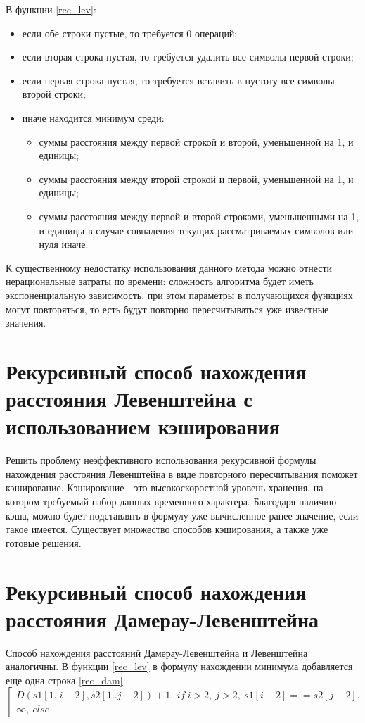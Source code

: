 В функции \ref{rec_lev}:
\begin{itemize}
	\item если обе строки пустые, то требуется 0 операций;
	\item если вторая строка пустая, то требуется удалить все символы первой строки;
	\item если первая строка пустая, то требуется вставить в пустоту все символы второй строки;
	\item иначе находится минимум среди:
	\begin{itemize}
		\item суммы расстояния между первой строкой и второй, уменьшенной на 1, и единицы;
		\item суммы расстояния между второй строкой и первой, уменьшенной на 1, и единицы;
		\item суммы расстояния между первой и второй строками, уменьшенными на 1, и единицы в случае совпадения текущих рассматриваемых символов или нуля иначе. 
	\end{itemize}
\end{itemize}

К существенному недостатку использования данного метода можно отнести нерациональные затраты по времени: сложность алгоритма будет иметь экспоненциальную зависимость, при этом параметры в получающихся функциях могут повторяться, то есть будут повторно пересчитываться уже известные значения. 

\section{Рекурсивный способ нахождения расстояния Левенштейна с использованием кэширования}
Решить проблему неэффективного использования рекурсивной формулы нахождения расстояния Левенштейна в виде повторного пересчитывания поможет кэширование. Кэширование - это высокоскоростной уровень хранения, на котором требуемый набор данных временного характера. \cite{IBM} Благодаря наличию кэша, можно будет подставлять в формулу уже вычисленное ранее значение, если такое имеется. Существует множество способов кэширования, а также уже готовые решения.

\section{Рекурсивный способ нахождения расстояния Дамерау-Левенштейна}
Способ нахождения расстояний Дамерау-Левенштейна и Левенштейна аналогичны. В функции \ref{rec_lev} в формулу нахождении минимума добавляется еще одна строка \ref{rec_dam}
\begin{equation}
	\label{rec_dam}
	\left[
	\begin{gathered}
		D(s1[1..i-2], s2[1..j-2]) + 1,~if~i > 2,~j > 2,~s1[i-2]==s2[j-2], \\
		{\infty},~else
	\end{gathered}
	\right. 
\end{equation}

